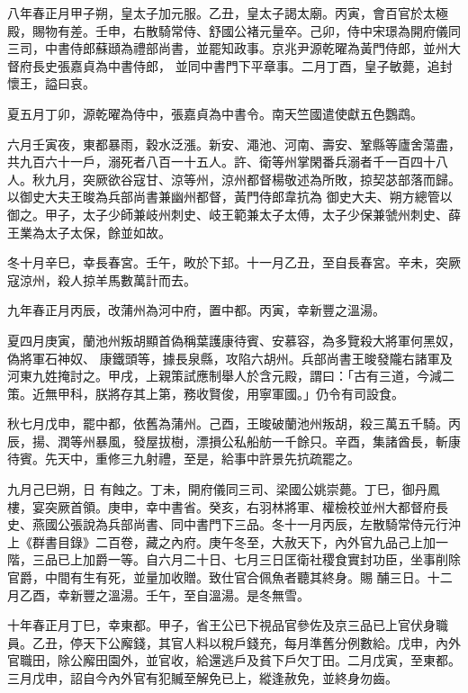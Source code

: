 \begin{pinyinscope}
 八年春正月甲子朔，皇太子加元服。乙丑，皇太子謁太廟。丙寅，會百官於太極殿，賜物有差。壬申，右散騎常侍、舒國公褚元量卒。己卯，侍中宋璟為開府儀同三司，中書侍郎蘇頲為禮部尚書，並罷知政事。京兆尹源乾曜為黃門侍郎，並州大督府長史張嘉貞為中書侍郎，
 並同中書門下平章事。二月丁酉，皇子敏薨，追封懷王，謚曰哀。



 夏五月丁卯，源乾曜為侍中，張嘉貞為中書令。南天竺國遣使獻五色鸚鵡。



 六月壬寅夜，東都暴雨，穀水泛漲。新安、澠池、河南、壽安、鞏縣等廬舍蕩盡，共九百六十一戶，溺死者八百一十五人。許、衛等州掌閑番兵溺者千一百四十八人。秋九月，突厥欲谷寇甘、涼等州，涼州都督楊敬述為所敗，掠契苾部落而歸。以御史大夫王晙為兵部尚書兼幽州都督，黃門侍郎韋抗為
 御史大夫、朔方總管以御之。甲子，太子少師兼岐州刺史、岐王範兼太子太傅，太子少保兼虢州刺史、薛王業為太子太保，餘並如故。



 冬十月辛巳，幸長春宮。壬午，畋於下邽。十一月乙丑，至自長春宮。辛未，突厥寇涼州，殺人掠羊馬數萬計而去。



 九年春正月丙辰，改蒲州為河中府，置中都。丙寅，幸新豐之溫湯。



 夏四月庚寅，蘭池州叛胡顯首偽稱葉護康待賓、安慕容，為多覽殺大將軍何黑奴，偽將軍石神奴、
 康鐵頭等，據長泉縣，攻陷六胡州。兵部尚書王晙發隴右諸軍及河東九姓掩討之。甲戌，上親策試應制舉人於含元殿，謂曰：「古有三道，今減二策。近無甲科，朕將存其上第，務收賢俊，用寧軍國。」仍令有司設食。



 秋七月戊申，罷中都，依舊為蒲州。己酉，王晙破蘭池州叛胡，殺三萬五千騎。丙辰，揚、潤等州暴風，發屋拔樹，漂損公私船舫一千餘只。辛酉，集諸酋長，斬康待賓。先天中，重修三九射禮，至是，給事中許景先抗疏罷之。



 九月己巳朔，日
 有蝕之。丁未，開府儀同三司、梁國公姚崇薨。丁巳，御丹鳳樓，宴突厥首領。庚申，幸中書省。癸亥，右羽林將軍、權檢校並州大都督府長史、燕國公張說為兵部尚書、同中書門下三品。冬十一月丙辰，左散騎常侍元行沖上《群書目錄》二百卷，藏之內府。庚午冬至，大赦天下，內外官九品己上加一階，三品已上加爵一等。自六月二十日、七月三日匡衛社稷食實封功臣，坐事削除官爵，中間有生有死，並量加收贈。致仕官合佩魚者聽其終身。賜
 酺三日。十二月乙酉，幸新豐之溫湯。壬午，至自溫湯。是冬無雪。



 十年春正月丁巳，幸東都。甲子，省王公已下視品官參佐及京三品已上官伏身職員。乙丑，停天下公廨錢，其官人料以稅戶錢充，每月準舊分例數給。戊申，內外官職田，除公廨田園外，並官收，給還逃戶及貧下戶欠丁田。二月戊寅，至東都。三月戊申，詔自今內外官有犯贓至解免已上，縱逢赦免，並終身勿齒。




\end{pinyinscope}
